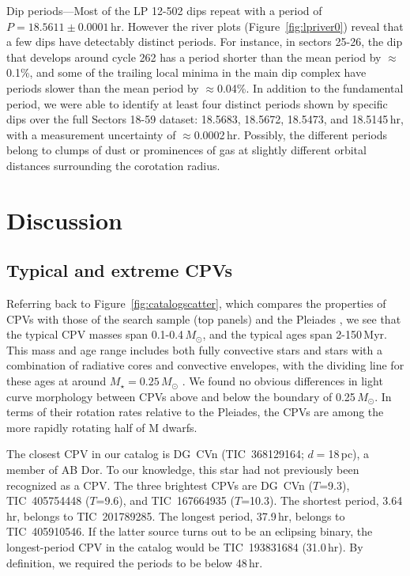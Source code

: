 \documentclass[11pt,twocolumn,tighten]{aastex63}
\begin{document}
{\sc Dip periods}---Most of the LP 12-502 dips repeat with a period of
$P=18.5611 \pm 0.0001$\,hr.  However the river plots
(Figure~\ref{fig:lpriver0}) reveal that a few dips have detectably
distinct periods.  For instance, in sectors 25-26, the dip that
develops around cycle 262 has a period shorter than the mean period by
$\approx$0.1\%, and some of the trailing local minima in the main dip
complex have periods slower than the mean period by $\approx$0.04\%.
In addition to the fundamental period, we were able to identify at
least four distinct periods shown by specific dips over the full
Sectors 18-59 dataset: 18.5683, 18.5672, 18.5473, and 18.5145\,hr,
with a measurement uncertainty of $\approx$0.0002\,hr. Possibly, the
different periods belong to clumps of dust or prominences of gas at
slightly different orbital distances surrounding the corotation
radius.



\section{Discussion}
\label{sec:discussion}


\subsection{Typical and extreme CPVs}
\label{subsec:extreme}

Referring back to Figure~\ref{fig:catalogscatter}, which compares the
properties of CPVs with those of the search sample (top panels) and the
Pleiades \citep{2016AJ....152..114R}, we see that the typical CPV
masses span 0.1-0.4\,$M_\odot$, and the typical ages span 2-150\,Myr.
This mass and age range includes both fully convective stars and stars
with a combination of radiative cores and convective envelopes, with
the dividing line for these ages at around $M_\star = 0.25\,M_\odot$
\citep{2018A&A...619A.177B}.  We found no obvious differences in light
curve morphology between CPVs above and below the boundary of
0.25\,$M_\odot$.  In terms of their rotation rates relative to the
Pleiades, the CPVs are among the more rapidly rotating half of M
dwarfs. 

The closest CPV in our catalog is DG~CVn (TIC~368129164; $d$$=$18\,pc),
a member of AB Dor.  To our knowledge, this star had not previously
been recognized as a CPV.  The three brightest CPVs are DG~CVn
($T$=9.3), TIC~405754448 ($T$=9.6), and TIC~167664935 ($T$=10.3).  The
shortest period, 3.64\,hr, belongs to TIC~201789285.  The longest
period, 37.9\,hr, belongs to TIC~405910546.  If the latter source
turns out to be an eclipsing binary, the longest-period CPV in the
catalog would be TIC~193831684 (31.0\,hr).  By definition, we required
the periods to be below 48\,hr.
\end{document}
